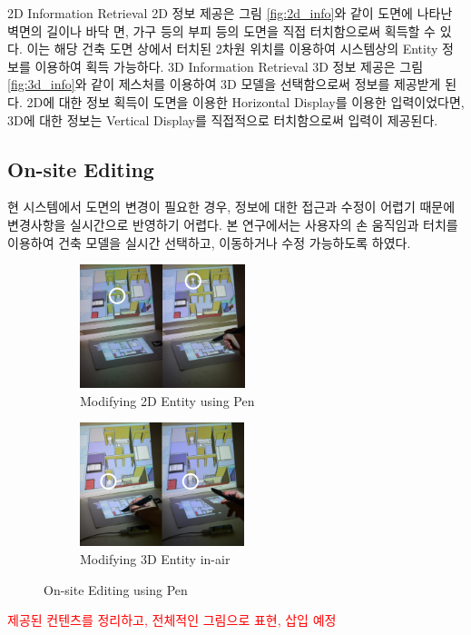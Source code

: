 2D Information Retrieval
2D 정보 제공은 그림 \ref{fig:2d_info}와 같이 도면에 나타난 벽면의 길이나 바닥 면, 가구 등의 부피 등의 도면을 직접 터치함으로써 획득할 수 있다. 이는 해당 건축 도면 상에서 터치된 2차원 위치를 이용하여 시스템상의 Entity 정보를 이용하여 획득 가능하다.
3D Information Retrieval
3D 정보 제공은 그림 \ref{fig:3d_info}와 같이 제스처를 이용하여 3D 모델을 선택함으로써 정보를 제공받게 된다. 2D에 대한 정보 획득이 도면을 이용한 Horizontal Display를 이용한 입력이었다면, 3D에 대한 정보는 Vertical Display를 직접적으로 터치함으로써 입력이 제공된다. 

\subsection{On-site Editing}
현 시스템에서 도면의 변경이 필요한 경우, 정보에 대한 접근과 수정이 어렵기 때문에 변경사항을 실시간으로 반영하기 어렵다. 본 연구에서는 사용자의 손 움직임과 터치를 이용하여 건축 모델을 실시간 선택하고, 이동하거나 수정 가능하도록 하였다. 
\begin{figure}[h!]
    \centering
        \begin{subfigure}[b]{0.49\columnwidth}
            \centering
                \includegraphics[width=1.0\columnwidth, height=3.6cm]{4-Interaction_Design/2d_move}
                \caption{Modifying 2D Entity using Pen}
                \label{fig:Pen_move}
        \end{subfigure}%
        \hfill
        \begin{subfigure}[b]{0.49\columnwidth}
            \centering
            \includegraphics[width=1.0\columnwidth, height=3.6cm]{4-Interaction_Design/3d_note}
                \caption{Modifying 3D Entity in-air}
                \label{fig:Annotation}
        \end{subfigure}
    \caption{On-site Editing using Pen}
    \label{fig:edit}
\end{figure}

\textcolor{red}{제공된 컨텐츠를 정리하고, 전체적인 그림으로 표현, 삽입 예정}
